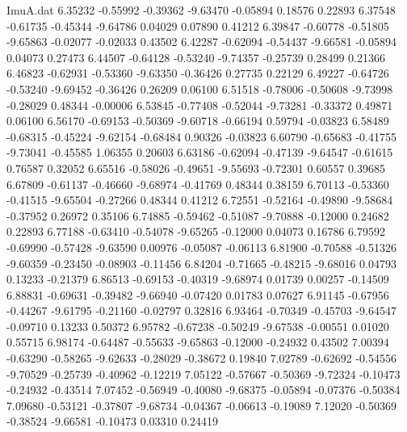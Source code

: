 \begin{filecontents}{ImuA.dat}
   6.35232   -0.55992   -0.39362   -9.63470   -0.05894    0.18576    0.22893
   6.37548   -0.61735   -0.45344   -9.64786    0.04029    0.07890    0.41212
   6.39847   -0.60778   -0.51805   -9.65863   -0.02077   -0.02033    0.43502
   6.42287   -0.62094   -0.54437   -9.66581   -0.05894    0.04073    0.27473
   6.44507   -0.64128   -0.53240   -9.74357   -0.25739    0.28499    0.21366
   6.46823   -0.62931   -0.53360   -9.63350   -0.36426    0.27735    0.22129
   6.49227   -0.64726   -0.53240   -9.69452   -0.36426    0.26209    0.06100
   6.51518   -0.78006   -0.50608   -9.73998   -0.28029    0.48344   -0.00006
   6.53845   -0.77408   -0.52044   -9.73281   -0.33372    0.49871    0.06100
   6.56170   -0.69153   -0.50369   -9.60718   -0.66194    0.59794   -0.03823
   6.58489   -0.68315   -0.45224   -9.62154   -0.68484    0.90326   -0.03823
   6.60790   -0.65683   -0.41755   -9.73041   -0.45585    1.06355    0.20603
   6.63186   -0.62094   -0.47139   -9.64547   -0.61615    0.76587    0.32052
   6.65516   -0.58026   -0.49651   -9.55693   -0.72301    0.60557    0.39685
   6.67809   -0.61137   -0.46660   -9.68974   -0.41769    0.48344    0.38159
   6.70113   -0.53360   -0.41515   -9.65504   -0.27266    0.48344    0.41212
   6.72551   -0.52164   -0.49890   -9.58684   -0.37952    0.26972    0.35106
   6.74885   -0.59462   -0.51087   -9.70888   -0.12000    0.24682    0.22893
   6.77188   -0.63410   -0.54078   -9.65265   -0.12000    0.04073    0.16786
   6.79592   -0.69990   -0.57428   -9.63590    0.00976   -0.05087   -0.06113
   6.81900   -0.70588   -0.51326   -9.60359   -0.23450   -0.08903   -0.11456
   6.84204   -0.71665   -0.48215   -9.68016    0.04793    0.13233   -0.21379
   6.86513   -0.69153   -0.40319   -9.68974    0.01739    0.00257   -0.14509
   6.88831   -0.69631   -0.39482   -9.66940   -0.07420    0.01783    0.07627
   6.91145   -0.67956   -0.44267   -9.61795   -0.21160   -0.02797    0.32816
   6.93464   -0.70349   -0.45703   -9.64547   -0.09710    0.13233    0.50372
   6.95782   -0.67238   -0.50249   -9.67538   -0.00551    0.01020    0.55715
   6.98174   -0.64487   -0.55633   -9.65863   -0.12000   -0.24932    0.43502
   7.00394   -0.63290   -0.58265   -9.62633   -0.28029   -0.38672    0.19840
   7.02789   -0.62692   -0.54556   -9.70529   -0.25739   -0.40962   -0.12219
   7.05122   -0.57667   -0.50369   -9.72324   -0.10473   -0.24932   -0.43514
   7.07452   -0.56949   -0.40080   -9.68375   -0.05894   -0.07376   -0.50384
   7.09680   -0.53121   -0.37807   -9.68734   -0.04367   -0.06613   -0.19089
   7.12020   -0.50369   -0.38524   -9.66581   -0.10473    0.03310    0.24419

\end{filecontents}
